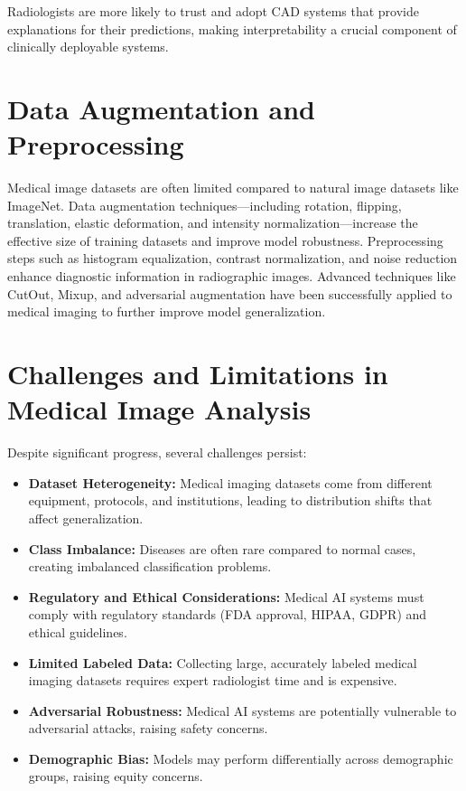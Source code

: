 {Radiologists are more likely to trust and adopt CAD systems that provide explanations for their predictions, making interpretability a crucial component of clinically deployable systems.

\section{Data Augmentation and Preprocessing}

Medical image datasets are often limited compared to natural image datasets like ImageNet. Data augmentation techniques—including rotation, flipping, translation, elastic deformation, and intensity normalization—increase the effective size of training datasets and improve model robustness. Preprocessing steps such as histogram equalization, contrast normalization, and noise reduction enhance diagnostic information in radiographic images. Advanced techniques like CutOut, Mixup, and adversarial augmentation have been successfully applied to medical imaging to further improve model generalization.

\section{Challenges and Limitations in Medical Image Analysis}

Despite significant progress, several challenges persist:

\begin{itemize}
    \item \textbf{Dataset Heterogeneity:} Medical imaging datasets come from different equipment, protocols, and institutions, leading to distribution shifts that affect generalization.
    \item \textbf{Class Imbalance:} Diseases are often rare compared to normal cases, creating imbalanced classification problems.
    \item \textbf{Regulatory and Ethical Considerations:} Medical AI systems must comply with regulatory standards (FDA approval, HIPAA, GDPR) and ethical guidelines.
    \item \textbf{Limited Labeled Data:} Collecting large, accurately labeled medical imaging datasets requires expert radiologist time and is expensive.
    \item \textbf{Adversarial Robustness:} Medical AI systems are potentially vulnerable to adversarial attacks, raising safety concerns.
    \item \textbf{Demographic Bias:} Models may perform differentially across demographic groups, raising equity concerns.
\end{itemize}

}
